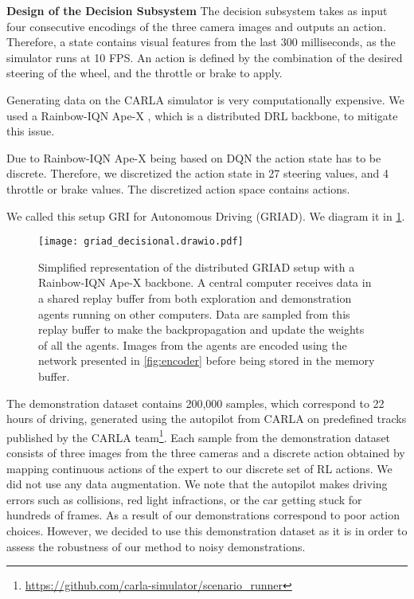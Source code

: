 \documentclass[letterpaper, 10 pt, conference]{ieeeconf}
\begin{document}
\textbf{Design of the Decision Subsystem} \label{sec:griad} The decision subsystem takes as input four consecutive encodings of the three camera images and outputs an action. Therefore, a state contains visual features from the last 300 milliseconds, as the simulator runs at 10 FPS. An action is defined by the combination of the desired steering of the wheel, and the throttle or brake to apply.

Generating data on the CARLA simulator is very computationally expensive. We used a Rainbow-IQN Ape-X \cite{drl-marin}, which is a distributed DRL backbone, to mitigate this issue.  

Due to Rainbow-IQN Ape-X being based on DQN \cite{dqn} the action state has to be discrete. Therefore, we discretized the action state in 27 steering values, and 4 throttle or brake values. The discretized action space contains  actions.

We called this setup GRI for Autonomous Driving (GRIAD). We diagram it in \cref{fig:griad-setup}.

\begin{figure}[h!]
    \centering
    \texttt{[image: griad\_decisional.drawio.pdf]}
    \caption{Simplified representation of the distributed GRIAD setup with a Rainbow-IQN Ape-X backbone. A central computer receives data in a shared replay buffer from both exploration and demonstration agents running on other computers. Data are sampled from this replay buffer to make the backpropagation and update the weights of all the agents. Images from the agents are encoded using the network presented in \cref{fig:encoder} before being stored in the memory buffer.}
    \label{fig:griad-setup}
\end{figure}

The demonstration dataset contains 200,000 samples, which correspond to 22 hours of driving, generated using the autopilot from CARLA on predefined tracks published by the CARLA team\footnote{\url{https://github.com/carla-simulator/scenario_runner}}. Each sample from the demonstration dataset consists of three images from the three cameras and a discrete action obtained by mapping continuous actions of the expert to our discrete set of RL actions. We did not use any data augmentation. We note that the autopilot makes driving errors such as collisions, red light infractions, or the car getting stuck for hundreds of frames. As a result  of our demonstrations correspond to poor action choices. However, we decided to use this demonstration dataset as it is in order to assess the robustness of our method to noisy demonstrations.  
\end{document}
